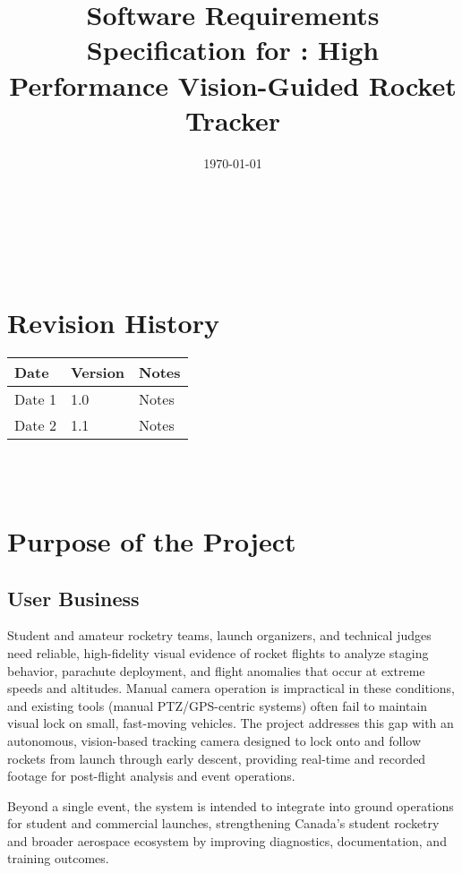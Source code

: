 \documentclass[12pt]{article}
\begin{document}
\title{Software Requirements Specification for \progname: High Performance Vision-Guided Rocket Tracker}
\author{\authname}
\date{\today}

\maketitle

~\newpage

\tableofcontents

~\newpage

\section*{Revision History}

\begin{tabularx}{\textwidth}{p{3cm}p{2cm}X}
  \toprule {\textbf{Date}} & {\textbf{Version}} & {\textbf{Notes}} \\
  \midrule
  Date 1                   & 1.0                & Notes            \\
  Date 2                   & 1.1                & Notes            \\
  \bottomrule
\end{tabularx}

~\\

~\newpage
\section{Purpose of the Project}
\subsection{User Business}

Student and amateur rocketry teams, launch organizers, and technical judges
need reliable, high-fidelity visual evidence of rocket flights to analyze
staging behavior, parachute deployment, and flight anomalies that occur at
extreme speeds and altitudes. Manual camera operation is impractical in these
conditions, and existing tools (manual PTZ/GPS-centric systems) often fail to
maintain visual lock on small, fast-moving vehicles. The project addresses this
gap with an autonomous, vision-based tracking camera designed to lock onto and
follow rockets from launch through early descent, providing real-time and
recorded footage for post-flight analysis and event operations.

Beyond a single event, the system is intended to integrate into ground
operations for student and commercial launches, strengthening Canada’s student
rocketry and broader aerospace ecosystem by improving diagnostics,
documentation, and training outcomes.
\end{document}
